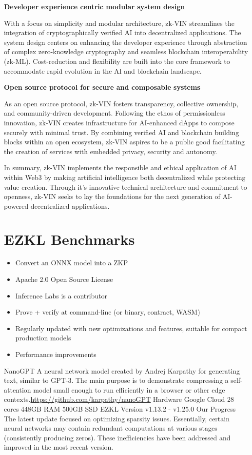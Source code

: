 \documentclass[conference]{IEEEtran}
\begin{document}
\noindent \textbf{Developer experience centric modular system design}

With a focus on simplicity and modular architecture, zk-VIN streamlines the integration of cryptographically verified AI into decentralized applications. The system design centers on enhancing the developer experience through abstraction of complex zero-knowledge cryptography and seamless blockchain interoperability (zk-ML). Cost-reduction and flexibility are built into the core framework to accommodate rapid evolution in the AI and blockchain landscape.

\noindent \textbf{Open source protocol for secure and composable systems}

As an open source protocol, zk-VIN fosters transparency, collective ownership, and community-driven development. Following the ethos of permissionless innovation, zk-VIN creates infrastructure for AI-enhanced dApps to compose securely with minimal trust. By combining verified AI and blockchain building blocks within an open ecosystem, zk-VIN aspires to be a public good facilitating the creation of services with embedded privacy, security and autonomy.

In summary, zk-VIN implements the responsible and ethical application of AI within Web3 by making artificial intelligence both decentralized while protecting value creation. Through it’s innovative technical architecture and commitment to openness, zk-VIN seeks to lay the foundations for the next generation of AI-powered decentralized applications.

\newpage

\section{EZKL Benchmarks}
\begin{itemize}
\item 	Convert an ONNX model into a ZKP
\item	Apache 2.0 Open Source License
\item	Inference Labs is a contributor
\item	Prove + verify at command-line (or binary, contract, WASM)
\item	Regularly updated with new optimizations and features, suitable for compact production models
\item	Performance improvements

\end{itemize}

NanoGPT A neural network model created by Andrej Karpathy for generating text, similar to GPT-3. The main purpose is to demonstrate compressing a self-attention model small enough to run efficiently in a browser or other edge contexts.\url{https://github.com/karpathy/nanoGPT} 
Hardware Google Cloud 28 cores 448GB RAM 500GB SSD 
EZKL Version v1.13.2 - v1.25.0
Our Progress The latest update focused on optimizing sparsity issues. Essentially, certain neural networks may contain redundant computations at various stages (consistently producing zeros). These inefficiencies have been addressed and improved in the most recent version.
\end{document}
